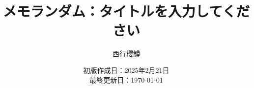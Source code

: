 \newcommand{\CATEGORY}{メモランダム}%
\newcommand{\TITLE}{タイトルを入力してください}
\newcommand{\AUTHORNAME}{西行櫻鱒}
\newcommand{\CREATEDAT}{2025年2月21日}

\title{\CATEGORY：\TITLE}
\author{\AUTHORNAME}
\date{初版作成日：\CREATEDAT\\最終更新日：\today\\}

